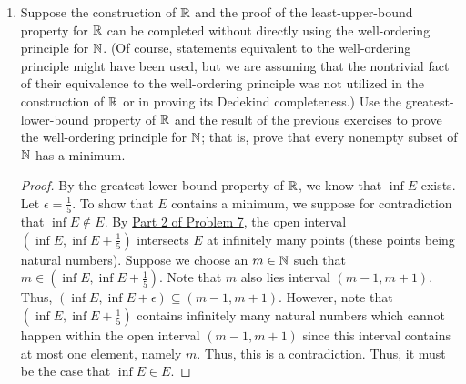 \documentclass[11pt,a4paper]{article}
\begin{document}
\begin{enumerate}
\begin{enumerate}
\begin{proof}
    Now, we will show that \( (\inf B, \inf B + \epsilon) \cap B \) contains infinitely many points. Thus, suppose for sake of contradiction that there exists an \( \epsilon > 0 \) such that \( (\inf B, \inf B + \epsilon) \cap B \) contains FINITELY many points. Denote these points by \( {b}_{i}  \) for \( 1 \leq i \leq n  \); that is
    \[  (\inf B, \inf B + \epsilon) \cap B = \{ {b}_{i} : 1 \leq i \leq n   \}  \]
    For all \( 1 \leq k \leq n  \), let \( {d}_{k } = | \inf B - {b}_{k } |  \). Since \( {b}_{k } \in B  \) and \( \inf B \notin  B  \), we must have \( | \inf B - {b}_{k } | > 0  \). Let 
    \[  d = \frac{ \min \{ {d}_{1}, {d}_{2}, \dots, {d}_{n} \}  }{ 2 }. \]
    But this implies that none of the \( {b}_{i} \) for \( 1 \leq i \leq n   \) lies within the open interval \( (\inf B , \inf B + d) \). That is, the set 
    \[  (\inf B , \inf B + d) \cap B = \emptyset \]
    which is a contradiction. Thus, the open interval \( (\inf B, \inf B + \epsilon) \) must have infinitely many points.
    \end{proof}
\end{enumerate}

\item Suppose the construction of \( \mathbb{R}  \) and the proof of the least-upper-bound property for \( \mathbb{R}  \) can be completed without directly using the well-ordering principle for \( \mathbb{N}  \). (Of course, statements equivalent to the well-ordering principle might have been used, but we are assuming that the nontrivial fact of their equivalence to the well-ordering principle was not utilized in the construction of \( \mathbb{R}  \) or in proving its Dedekind completeness.) Use the greatest-lower-bound property of \( \mathbb{R}  \) and the result of the previous exercises to prove the well-ordering principle for \( \mathbb{N}  \); that is, prove that every nonempty subset of \( \mathbb{N}  \) has a minimum.
    \begin{proof}
    By the greatest-lower-bound property of \( \mathbb{R}  \), we know that \( \inf E  \) exists.
    Let \( \epsilon = \frac{ 1 }{ 5 }   \). To show that \( E  \) contains a minimum, we suppose for contradiction that \( \inf E \notin E  \). By {\hyperref[Problem 2]{Part 2 of Problem 7}}, the open interval \( (\inf E, \inf E + \frac{ 1 }{ 5 } ) \) intersects \( E  \) at infinitely many points (these points being natural numbers). Suppose we choose an \( m \in \mathbb{N} \) such that \( m  \in (\inf E , \inf E + \frac{ 1 }{ 5 }  ) \).  Note that \( m  \) also lies interval \( (m - 1, m + 1) \). Thus, \( (\inf E, \inf E + \epsilon) \subseteq (m-1,m+1) \). However, note that \( (\inf E, \inf E + \frac{ 1 }{ 5 }) \) contains infinitely many natural numbers which cannot happen within the open interval \( (m-1,m+1) \) since this interval contains at most one element, namely \( m \). Thus, this is a contradiction. Thus, it must be the case that \( \inf E \in E  \).
\end{proof}


\end{enumerate}
\end{document}
